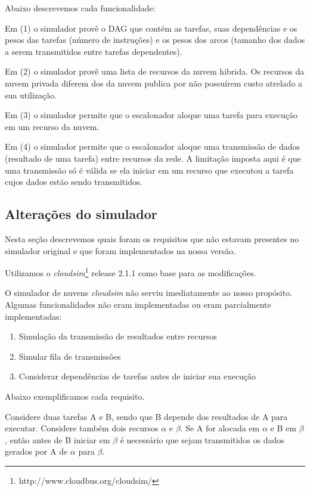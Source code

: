 \documentclass[a4paper,10pt]{article}
\begin{document}
Abaixo descrevemos cada funcionalidade:

Em (1) o simulador provê o DAG que contém as tarefas, suas dependências e os pesos das tarefas (número
de instruções) e os pesos dos arcos (tamanho dos dados a serem transmitidos entre tarefas dependentes).

Em (2) o simulador provê uma lista de recursos da nuvem hibrida. Os recursos da nuvem privada diferem
dos da nuvem publica por não possuírem custo atrelado a sua utilização.

Em (3) o simulador permite que o escalonador aloque uma tarefa para execução em um recurso da nuvem.

Em (4) o simulador permite que o escalonador aloque uma transmissão de dados (resultado de uma tarefa)
entre recursos da rede. A limitação imposta aqui é que uma transmissão só é válida se ela iniciar em um
recurso que executou a tarefa cujos dados estão sendo transmitidos.

\subsection{Alterações do simulador}

Nesta seção descrevemos quais foram os requisitos que não estavam presentes no simulador original
e que foram implementados na nossa versão.

Utilizamos o \emph{cloudsim}\footnote{http://www.cloudbus.org/cloudsim/} release 2.1.1 como base para as modificações.
 
O simulador de nuvens \emph{cloudsim} não serviu imediatamente ao nosso propósito. Algumas funcionalidades
não eram implementadas ou eram parcialmente implementadas:

\begin{enumerate}

  \item Simulação da transmissão de resultados entre recursos
  \item Simular fila de transmissões
  \item Considerar dependências de tarefas antes de iniciar sua execução

\end{enumerate}

Abaixo exemplificamos cada requisito.

Considere duas tarefas A e B, sendo que B depende dos resultados de A para executar.
Considere também dois recursos $\alpha$ e $\beta$.
Se A for alocada em $\alpha$ e B em $\beta$, então antes de B iniciar em $\beta$ é necessário
que sejam transmitidos os dados gerados por A de $\alpha$ para $\beta$.
\end{document}
